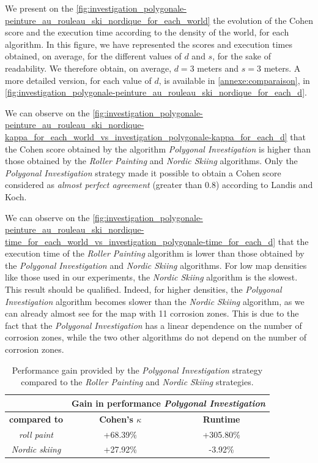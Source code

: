 We present on the \ref{fig:investigation_polygonale-peinture_au_rouleau_ski_nordique_for_each_world} the evolution of the Cohen score and the execution time according to the density of the world, for each algorithm.
In this figure, we have represented the scores and execution times obtained, on average, for the different values of $d$ and $s$, for the sake of readability.
We therefore obtain, on average, $d = 3$ meters and $s = 3$ meters.
A more detailed version, for each value of $d$, is available in \ref{annexe:comparaison}, in \ref{fig:investigation_polygonale-peinture_au_rouleau_ski_nordique_for_each_d}.

We can observe on the \ref{fig:investigation_polygonale-peinture_au_rouleau_ski_nordique-kappa_for_each_world_vs_investigation_polygonale-kappa_for_each_d} that the Cohen score obtained by the algorithm \textit{Polygonal Investigation} is higher than those obtained by the \textit{Roller Painting} and \textit{Nordic Skiing} algorithms.
Only the \textit{Polygonal Investigation} strategy made it possible to obtain a Cohen score considered as \textit{almost perfect agreement} (greater than 0.8) according to Landis and Koch.

We can observe on the \ref{fig:investigation_polygonale-peinture_au_rouleau_ski_nordique-time_for_each_world_vs_investigation_polygonale-time_for_each_d} that the execution time of the \textit{Roller Painting} algorithm is lower than those obtained by the \textit{Polygonal Investigation} and \textit{Nordic Skiing} algorithms.
For low map densities like those used in our experiments, the \textit{Nordic Skiing} algorithm is the slowest.
This result should be qualified.
Indeed, for higher densities, the \textit{Polygonal Investigation} algorithm becomes slower than the \textit{Nordic Skiing} algorithm, as we can already almost see for the map with 11 corrosion zones.
This is due to the fact that the \textit{Polygonal Investigation} has a linear dependence on the number of corrosion zones, while the two other algorithms do not depend on the number of corrosion zones.

\begin{table}[h!]
	\centering
	\begin{tabular}{|c|c|c|}
		\hline
		& \multicolumn{2}{c|}{\textbf{Gain in performance \textit{Polygonal Investigation}}} \\
		\hline
		\textbf{compared to} & \textbf{Cohen's $\kappa$} & \textbf{Runtime} \\
		\hline
		\textit{roll paint} & +68.39\% & +305.80\% \\
		\hline
		\textit{Nordic skiing} & +27.92\% & -3.92\% \\
		\hline
	\end{tabular}
	\caption{Performance gain provided by the \textit{Polygonal Investigation} strategy compared to the \textit{Roller Painting} and \textit{Nordic Skiing} strategies.}
	\label{tab:gain}
\end{table}

